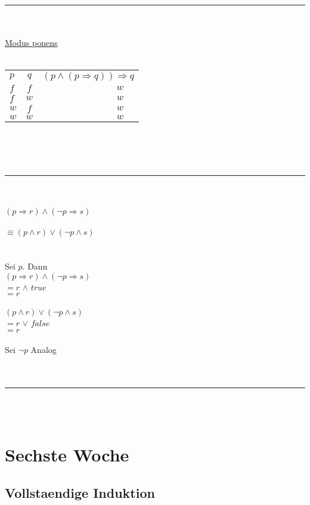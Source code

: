 \documentclass[18pt,a4paper]{article}
\newcommand{\tab}{\hspace*{2em}}
\begin{document}
\rule{\textwidth}{0.4mm}\\
\\
\uline{Modus ponens}\\
\\
\begin{tabular}{ l c r }
  $p$ & $q$ & $(p\wedge (p\Rightarrow q)) \Rightarrow q$ \\
  $f$ & $f$ & $w\:\:\:\:\:$ \\
  $f$ & $w$ & $w\:\:\:\:\:$ \\
  $w$ & $f$ & $w\:\:\:\:\:$ \\
  $w$ & $w$ & $w\:\:\:\:\:$
\end{tabular}
\\
\\
\\
\rule{\textwidth}{0.4mm}\\
\\
$(p\Rightarrow r)\wedge (\neg p \Rightarrow s)$\\
\\
$\equiv (p\wedge r) \vee (\neg p\wedge s)$\\
\\
\\
Sei $p$. Dann\\
\tab $(p\Rightarrow r)\wedge (\neg p \Rightarrow s)$\\
$=$\tab $r$ \:\:\:\:\:$\wedge$ \:\:\:$true$\\
$=$\tab $r$\\
\\
\tab $(p\wedge r)\vee (\neg p \wedge s)$\\
$=$\tab $r$ \:\:\:\:\:$\vee$ \:\:\:$false$\\
$=$\tab $r$\\
\\
Sei $\neg p$ Analog\\
\\
\\
\rule{\textwidth}{0.4mm}\\
\\

\section{Sechste Woche}

\subsection{Vollstaendige Induktion}
\end{document}
